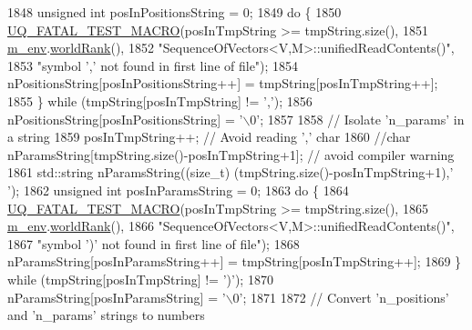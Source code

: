 \begin{DoxyCode}
1848               \textcolor{keywordtype}{unsigned} \textcolor{keywordtype}{int} posInPositionsString = 0;
1849               \textcolor{keywordflow}{do} \{
1850                 \hyperlink{_defines_8h_a56d63d18d0a6d45757de47fcc06f574d}{UQ\_FATAL\_TEST\_MACRO}(posInTmpString >= tmpString.size(),
1851                                     \hyperlink{class_q_u_e_s_o_1_1_base_vector_sequence_a8e8824d2a63c5a43bcc6473e3a0491e8}{m\_env}.\hyperlink{class_q_u_e_s_o_1_1_base_environment_a78b57112bbd0e6dd0e8afec00b40ffa7}{worldRank}(),
1852                                     \textcolor{stringliteral}{"SequenceOfVectors<V,M>::unifiedReadContents()"},
1853                                     \textcolor{stringliteral}{"symbol ',' not found in first line of file"});
1854                 nPositionsString[posInPositionsString++] = tmpString[posInTmpString++];
1855               \} \textcolor{keywordflow}{while} (tmpString[posInTmpString] != \textcolor{charliteral}{','});
1856               nPositionsString[posInPositionsString] = \textcolor{charliteral}{'\(\backslash\)0'};
1857 
1858               \textcolor{comment}{// Isolate 'n\_params' in a string}
1859               posInTmpString++; \textcolor{comment}{// Avoid reading ',' char}
1860               \textcolor{comment}{//char nParamsString[tmpString.size()-posInTmpString+1]; // avoid compiler warning}
1861         std::string nParamsString((\textcolor{keywordtype}{size\_t}) (tmpString.size()-posInTmpString+1),\textcolor{charliteral}{' '});
1862               \textcolor{keywordtype}{unsigned} \textcolor{keywordtype}{int} posInParamsString = 0;
1863               \textcolor{keywordflow}{do} \{
1864                 \hyperlink{_defines_8h_a56d63d18d0a6d45757de47fcc06f574d}{UQ\_FATAL\_TEST\_MACRO}(posInTmpString >= tmpString.size(),
1865                                     \hyperlink{class_q_u_e_s_o_1_1_base_vector_sequence_a8e8824d2a63c5a43bcc6473e3a0491e8}{m\_env}.\hyperlink{class_q_u_e_s_o_1_1_base_environment_a78b57112bbd0e6dd0e8afec00b40ffa7}{worldRank}(),
1866                                     \textcolor{stringliteral}{"SequenceOfVectors<V,M>::unifiedReadContents()"},
1867                                     \textcolor{stringliteral}{"symbol ')' not found in first line of file"});
1868                 nParamsString[posInParamsString++] = tmpString[posInTmpString++];
1869               \} \textcolor{keywordflow}{while} (tmpString[posInTmpString] != \textcolor{charliteral}{')'});
1870               nParamsString[posInParamsString] = \textcolor{charliteral}{'\(\backslash\)0'};
1871 
1872               \textcolor{comment}{// Convert 'n\_positions' and 'n\_params' strings to numbers}

\end{DoxyCode}
